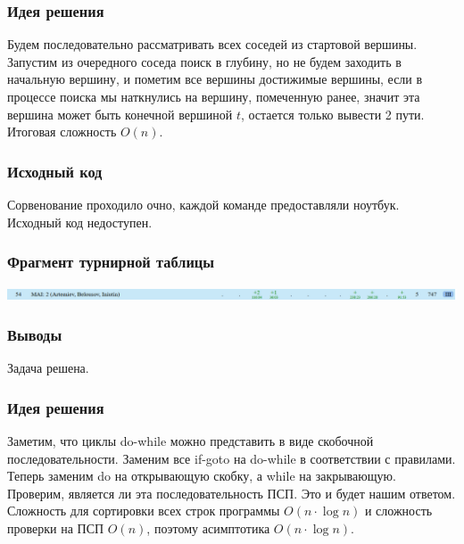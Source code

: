 
\subsubsection*{Идея решения}
Будем последовательно рассматривать всех соседей из стартовой вершины. Запустим из очередного соседа поиск в глубину, но не будем заходить в начальную вершину, и пометим все вершины достижимые вершины, если в процессе поиска мы наткнулись на вершину, помеченную ранее, значит эта вершина может быть конечной вершиной $t$, остается только вывести 2 пути. Итоговая сложность $O(n)$.
\subsubsection*{Исходный код}
Сорвенование проходило очно, каждой команде предоставляли ноутбук. Исходный код недоступен.
\subsubsection*{Фрагмент турнирной таблицы}
\includegraphics[width=\textwidth]{images/220413.png}\newline\noindent
\subsubsection*{Выводы}
Задача решена.
\pagebreak



\subsubsection*{Идея решения}
Заметим, что циклы do-while можно представить в виде скобочной последовательности. Заменим все if-goto на do-while в соответствии с правилами. Теперь заменим do на открывающую скобку, а while на закрывающую. Проверим, является ли эта последовательность ПСП. Это и будет нашим ответом. Сложность для сортировки всех строк программы $O(n \cdot \log{n})$ и сложность проверки на ПСП $O(n)$, поэтому асимптотика $O(n \cdot \log{n})$.
